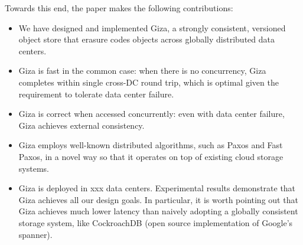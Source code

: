 Towards this end, the paper makes the following contributions:
\begin{itemize}
    \item We have designed and implemented Giza, a strongly consistent, versioned object store that erasure codes objects across globally distributed data centers.
    \item Giza is fast in the common case: when there is no concurrency, Giza completes within single cross-DC round trip, which is optimal given the requirement to tolerate data center failure.
    \item Giza is correct when accessed concurrently: even with data center failure, Giza achieves external consistency.
    \item Giza employs well-known distributed algorithms, such as Paxos and Fast Paxos, in a novel way so that it operates on top of existing cloud storage systems.
    \item Giza is deployed in xxx data centers. Experimental results demonstrate that Giza achieves all our design goals. In particular, it is worth pointing out that Giza achieves much lower latency than naively adopting a globally consistent storage system, like CockroachDB (open source implementation of Google's spanner).
\end{itemize}
